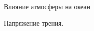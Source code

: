 \begin{chapter}{Влияние атмосферы на океан}
\begin{section}{Напряжение трения.}

%


\end{section}


\end{chapter}
